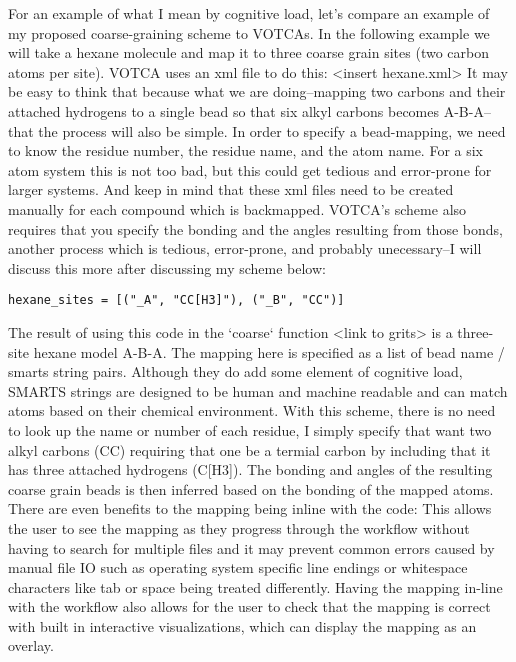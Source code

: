 For an example of what I mean by cognitive load, let's compare an example of my proposed coarse-graining scheme to VOTCAs.
In the following example we will take a hexane molecule and map it to three coarse grain sites (two carbon atoms per site).
VOTCA uses an xml file to do this:
<insert hexane.xml>
It may be easy to think that because what we are doing--mapping two carbons and their attached hydrogens to a single bead so that six alkyl carbons becomes A-B-A--that the process will also be simple.
In order to specify a bead-mapping, we need to know the residue number, the residue name, and the atom name.
For a six atom system this is not too bad, but this could get tedious and error-prone for larger systems.
And keep in mind that these xml files need to be created manually for each compound which is backmapped.
VOTCA's scheme also requires that you specify the bonding and the angles resulting from those bonds, another process which is tedious, error-prone, and probably unecessary--I will discuss this more after discussing my scheme below:
\begin{lstlisting}
hexane_sites = [("_A", "CC[H3]"), ("_B", "CC")]
\end{lstlisting}
The result of using this code in the `coarse` function <link to grits> is a three-site hexane model A-B-A.
The mapping here is specified as a list of bead name / smarts string pairs.
Although they do add some element of cognitive load, SMARTS strings are designed to be human and machine readable and can match atoms based on their chemical environment.
With this scheme, there is no need to look up the name or number of each residue, I simply specify that want two alkyl carbons (CC) requiring that one be a termial carbon by including that it has three attached hydrogens (C[H3]).
The bonding and angles of the resulting coarse grain beads is then inferred based on the bonding of the mapped atoms.
There are even benefits to the mapping being inline with the code:
This allows the user to see the mapping as they progress through the workflow without having to search for multiple files and it may prevent common errors caused by manual file IO such as operating system specific line endings or whitespace characters like tab or space being treated differently.
Having the mapping in-line with the workflow also allows for the user to check that the mapping is correct with built in interactive visualizations, which can display the mapping as an overlay.


